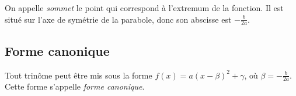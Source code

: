 \begin{definition}
  On appelle \emph{sommet} le point qui correspond à l'extremum de la fonction. Il est situé sur l'axe de symétrie de la parabole, donc son abscisse est $-\frac{b}{2a}$.
\end{definition}

\subsection{Forme canonique}

\begin{propriete}
  Tout trinôme peut être mis sous la forme $f(x)=a(x-\beta)^2+\gamma$, où $\beta=-\frac{b}{2a}$. Cette forme s'appelle \emph{forme canonique}.
\end{propriete}
